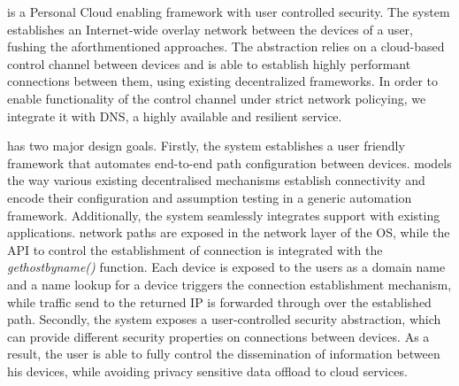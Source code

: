 \signpost is a Personal Cloud enabling framework with user controlled security.
The system establishes an Internet-wide overlay network between the devices of a
user, fushing the aforthmentioned approaches. The abstraction relies on a
cloud-based control channel between devices and is able to establish highly
performant connections between them, using existing decentralized
frameworks. In order to enable functionality of the control channel under strict
network policying, we integrate it with DNS, a highly available and resilient
service. 

\signpost has two major design goals.  Firstly, the system establishes a user
friendly framework that automates end-to-end path configuration between devices.
\signpost models the way various existing decentralised mechanisms establish
connectivity and encode their configuration and assumption testing in a generic
automation framework.  Additionally, the system seamlessly integrates support
with existing applications. \signpost network paths are exposed in the network
layer of the OS, while the API to control the establishment of connection is
integrated with the \textit{gethostbyname()} function.  Each device is exposed to the users as a
domain name and a name lookup for a device triggers the connection establishment
mechanism, while traffic send to the returned IP is forwarded through \of over
the established path.  Secondly, the system exposes a user-controlled security
abstraction, which can provide different security properties on connections
between devices. As a result, the user is able to fully control the
dissemination of information between his devices, while avoiding
privacy sensitive data offload to cloud services. 

